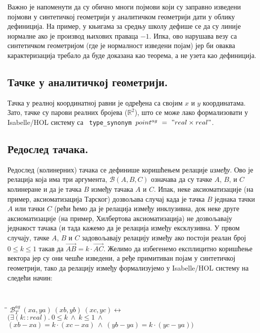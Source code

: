 \documentclass[a4paper, 12pt]{article}
\newcommand{\agbett}[3]{\ensuremath{\mathcal{B}_T^{\mathit{ag}}\ #1\ #2\ #3}}
\newcommand{\vect}[1]{\vec{#1}}
\begin{document}
Важно је напоменути да су обично многи појмови који су заправно
изведени појмови у синтетичкој геометрији у аналитичком геометрији
дати у облику дефиниција. На пример, у књигама за средњу школу дефише
се да су линије нормалне ако је производ њихових праваца $-1$. Ипка,
ово нарушава везу са синтетичком геометријом (где је нормалност
изведени појам) јер би оваква карактеризација требало да буде доказана
као теорема, а не узета као дефиниција.

\subsection{Тачке у аналитичкој геометрији.}
Тачка у реалној координатној равни је одређена са својим $x$ и $y$
координатама. Зато, тачке су парови реалних бројева ($\mathbb{R}^2$),
што се може лако формализовати у Isabelle/HOL систему са {\tt
  type\_synonym\ $point^{ag}\ =\ "real \times real"$}.

\subsection{Редослед тачака.} Редослед (колинерних) тачака се
дефинише коришћењем релације \emph{између}. Ово је релација која има
три аргумента, $\mathcal{B}(A, B, C)$ означава да су тачке $A$, $B$, и
$C$ колинеране и да је тачка $B$ између тачака $A$ и $C$. Ипак, неке
аксиоматизације (на пример, аксиоматизација Тарског) дозвољава случај
када је тачка $B$ једнака тачки $A$ или тачки $C$ (рећи ћемо да је
релација између инклузивна, док неке друге аксиоматизације (на пример,
Хилбертова аксиоматизација) не дозвољавају једнакост тачака (и тада
кажемо да је релација између ексклузивна. У првом случају, тачке $A$,
$B$ и $C$ задовољавају релацију између ако постоји реалан број $0 \le
k \le 1$ такав да $\vect{AB} = k \cdot \vect{AC}$. Желимо да
избегенемо експлицитно коришћење вектора јер су они чешће изведени, а
ређе примитиван појам у синтетичкој геометрији, тако да релацију
између формализујемо у Isabelle/HOL систему на следећи начин:

{\tt
\begin{tabbing}
\hspace{5mm}\=\hspace{5mm}\=\kill
$\agbett{(xa, ya)}{(xb, yb)}{(xc, yc)} \longleftrightarrow$\\
\>$(\exists (k::real).\ 0 \le k \ \wedge\ k \le 1 \ \wedge$\\
\>\>$(xb - xa) = k \cdot (xc - xa) \ \wedge\ (yb - ya) = k \cdot (yc - ya))$
\end{tabbing}
}
\end{document}
